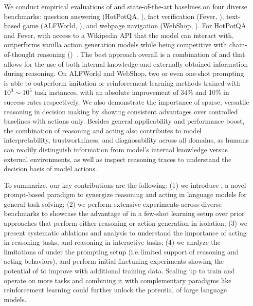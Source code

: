 We conduct empirical evaluations of \model{} and state-of-the-art baselines on four diverse benchmarks: question answering (HotPotQA, \citealp{yang2018hotpotqa}), fact verification (Fever, \citealp{thorne2018fever}), text-based game (ALFWorld, \citealp{shridhar2020alfworld}), and webpage navigation (WebShop, \citealp{yao2022webshop}). 
For HotPotQA and Fever, with access to a Wikipedia API that the model can interact with, \model{} outperforms vanilla action generation models while being competitive with chain-of-thought reasoning (\reason{})~\citep{wei2022chain}. The best approach overall is a combination of \model{} and \reason{} that allows for the use of both internal knowledge and externally obtained information during reasoning.
On ALFWorld and WebShop, two or even one-shot \model{} prompting is able to outperform imitation or reinforcement learning methods trained with $10^3 \sim 10^5$ task instances, with an absolute improvement of 34\% and 10\% in success rates respectively. We also demonstrate the importance of sparse, versatile reasoning in decision making by showing consistent advantages over controlled baselines with actions only. 
Besides general applicability and performance boost, the combination of reasoning and acting also contributes to model interpretability, trustworthiness, and diagnosability across all domains, as humans can readily distinguish information from model's internal knowledge versus external environments, as well as inspect reasoning traces to understand the decision basis of model actions. 


To summarize, our key contributions are the following: 
(1) we introduce \model{}, a novel prompt-based paradigm to synergize reasoning and acting in language models for general task solving; 
(2) we perform extensive experiments across diverse benchmarks to showcase the advantage of \model{} in a few-shot learning setup over prior approaches that perform either reasoning or action generation in isolation;
(3) we present systematic ablations and analysis to understand the importance of acting in reasoning tasks, and reasoning in interactive tasks; 
(4) we analyze the limitations of \model{} under the prompting setup (i.e.\,limited support of reasoning and acting behaviors), and perform initial finetuning experiments showing the potential of \model{} to improve with additional training data. 
Scaling up \model{} to train and operate on more tasks and combining it with complementary paradigms like reinforcement learning could further unlock the potential of large language models. 




















